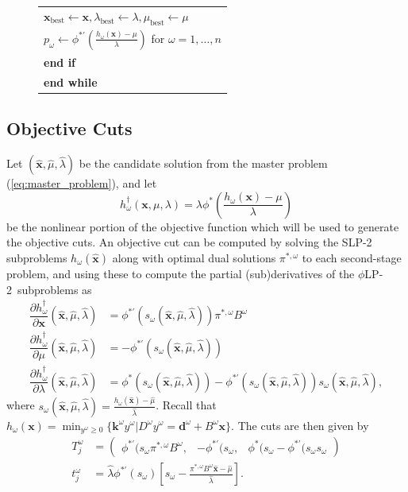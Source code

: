 \documentclass[ijoc,letterpaper]{informs3} %
\newcommand{\x}{\mathbf{x}}
\newcommand{\xh}{\hat{\x}}
\newcommand{\lh}{\hat{\lambda}}
\newcommand{\mh}{\hat{\mu}}
\renewcommand{\k}{\mathbf{k}}
\renewcommand{\d}{\mathbf{d}}
\newcommand{\plp}{$\phi$LP-2}
\begin{document}
\begin{figure}
{\begin{tabular}{l}
		\hspace{48pt} $\x_\text{best} \gets \x, \lambda_\text{best} \gets \lambda, \mu_\text{best} \gets \mu$ \\
		\hspace{48pt} $p_\omega \gets \phi^{*\prime}(\tfrac{h_\omega(\x) - \mu}{\lambda})$ for $\omega = 1, \dots, n$ \\
	\hspace{24pt} \textbf{end if} \\
	\textbf{end while} \\
	\hline
 \end{tabular}
}
{}
\end{figure}

\subsection{Objective Cuts}

Let $(\xh,\mh, \lh)$ be the candidate solution from the master problem (\ref{eq:master_problem}), and let 
\[
	h^\dagger_\omega(\x,\mu,\lambda) = \lambda \phi^*\left(\frac{h_\omega(\x) - \mu}{\lambda}\right)
\]
be the nonlinear portion of the objective function which will be used to generate the objective cuts.
An objective cut can be computed by solving the SLP-2 subproblems $h_\omega(\xh)$ along with optimal dual solutions $\pi^{*,\omega}$ to each second-stage problem, and using these to compute the partial (sub)derivatives of the \plp\ subproblems as
\begin{align*}
	\dfrac{\partial h^\dagger_\omega}{\partial \x}(\xh,\mh,\lh) & = \phi^{*\prime}(s_\omega(\xh,\mh,\lh)) \pi^{*,\omega}B^\omega \\
	\dfrac{\partial h^\dagger_\omega}{\partial \mu}(\xh,\mh,\lh) & = -\phi^{*\prime}(s_\omega(\xh,\mh,\lh)) \\
	\dfrac{\partial h^\dagger_\omega}{\partial \lambda}(\xh,\mh,\lh) & = \phi^*(s_\omega(\xh,\mh,\lh)) - \phi^{*\prime}(s_\omega(\xh,\mh,\lh))s_\omega(\xh,\mh,\lh),
\end{align*}
where $s_\omega(\xh,\mh,\lh) = \frac{h_\omega(\xh) - \mh}{\lh}$.
Recall that $h_\omega(\x) = \min_{y^\omega \geq 0} \{\k^\omega y^\omega | D^\omega y^\omega = \d^\omega + B^\omega \x\}$.
The cuts are then given by
\begin{align*}
	T_j^\omega & = 
	\left( \begin{array}{ccc}
		\phi^{*\prime}(s_\omega \pi^{*,\omega}B^\omega, 
			 & -\phi^{*\prime}(s_\omega, 
			 & \phi^*(s_\omega - \phi^{*\prime}(s_\omega s_\omega
	\end{array} \right) \\
	t_j^\omega & = \lh \phi^{*\prime}(s_\omega)\left[s_\omega - \frac{\pi^{*,\omega}B^\omega\xh - \mh}{\lh}\right].
\end{align*}
\end{document}
